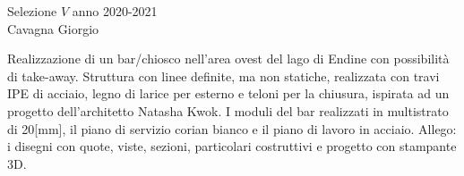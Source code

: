 \begin{center}
	\centering
	{\LARGE Selezione $V$ anno 2020-2021} \\
	\vspace{0.5cm}
	{\large Cavagna Giorgio}
	\vspace{0.5cm}
\end{center}

\noindent
Realizzazione di un bar/chiosco nell'area ovest del lago di Endine con possibilità di take-away.
Struttura con linee definite, ma non statiche, realizzata con travi IPE di acciaio, legno di larice per esterno e teloni per la chiusura, ispirata ad un progetto dell'architetto Natasha Kwok.
I moduli del bar realizzati in multistrato di 20[mm], il piano di servizio corian bianco e il piano di lavoro in acciaio.
Allego: i disegni con quote, viste, sezioni, particolari costruttivi e progetto con stampante 3D.